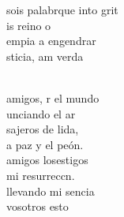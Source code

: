 \documentclass[12pt]{article}
\begin{document}
\begin{multicols*}{2}
\begin{cancion}[Id y enseñad][Garabaín]
	sois palabrque into grit\\
	is reino o       \\
	 empia a engendrar\\
	sticia, am verda\\\jump\\
	\begin{chorus}%
	amigos, r el mundo\\
	unciando el ar\\
	sajeros de lida,\\
	a paz y el peón.\\
	amigos losestigos\\
	 mi resurreccn. \\
	llevando mi sencia\\
	vosotros esto\\
	\end{chorus}%
	\jump\\
\end{cancion}%


\end{multicols*}
\end{document}
